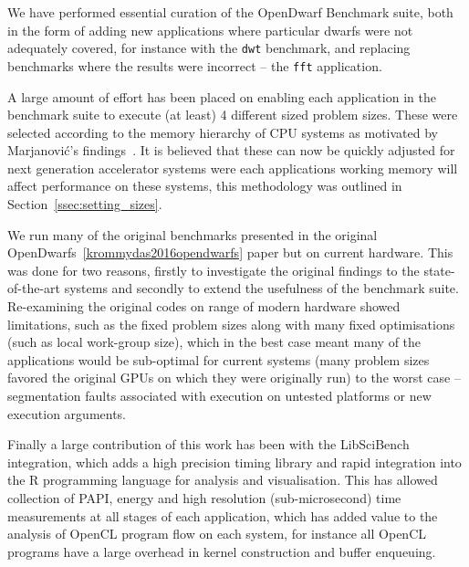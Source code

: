 \documentclass[../document.tex]{subfiles}
\begin{document}
\label{sec:conclusions}

We have performed essential curation of the OpenDwarf Benchmark suite, both in the form of adding new applications where particular dwarfs were not adequately covered, for instance with the {\tt dwt} benchmark, and replacing benchmarks where the results were incorrect -- the {\tt fft} application.

A large amount of effort has been placed on enabling each application in the benchmark suite to execute (at least) 4 different sized problem sizes.
These were selected according to the memory hierarchy of CPU systems as motivated by Marjanovi{\'c}'s findings~\cite{marjanovic2016hpc}.
It is believed that these can now be quickly adjusted for next generation accelerator systems were each applications working memory will affect performance on these systems, this methodology was outlined in Section~\ref{ssec:setting_sizes}.

We run many of the original benchmarks presented in the original OpenDwarfs~\ref{krommydas2016opendwarfs} paper but on current hardware.
This was done for two reasons, firstly to investigate the original findings to the state-of-the-art systems and secondly to extend the usefulness of the benchmark suite.
Re-examining the original codes on range of modern hardware showed limitations, such as the fixed problem sizes along with many fixed optimisations (such as local work-group size), which in the best case meant many of the applications would be sub-optimal for current systems (many problem sizes favored the original GPUs on which they were originally run) to the worst case -- segmentation faults associated with execution on untested platforms or new execution arguments.

Finally a large contribution of this work has been with the LibSciBench integration, which adds a high precision timing library and rapid integration into the R programming language for analysis and visualisation.
This has allowed collection of PAPI, energy and high resolution (sub-microsecond) time measurements at all stages of each application, which has added value to the analysis of OpenCL program flow on each system, for instance all OpenCL programs have a large overhead in kernel construction and buffer enqueuing.
\end{document}
